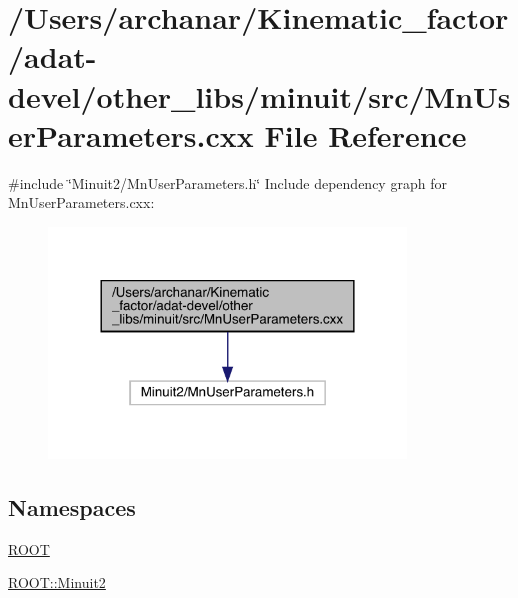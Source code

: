 \hypertarget{adat-devel_2other__libs_2minuit_2src_2MnUserParameters_8cxx}{}\section{/\+Users/archanar/\+Kinematic\+\_\+factor/adat-\/devel/other\+\_\+libs/minuit/src/\+Mn\+User\+Parameters.cxx File Reference}
\label{adat-devel_2other__libs_2minuit_2src_2MnUserParameters_8cxx}
{\ttfamily \#include \char`\"{}Minuit2/\+Mn\+User\+Parameters.\+h\char`\"{}}\newline
Include dependency graph for Mn\+User\+Parameters.\+cxx\+:
\nopagebreak
\begin{figure}[H]
\begin{center}
\leavevmode
\includegraphics[width=269pt]{df/dbf/adat-devel_2other__libs_2minuit_2src_2MnUserParameters_8cxx__incl}
\end{center}
\end{figure}
\subsection*{Namespaces}
\begin{DoxyCompactItemize}
\item 
 \mbox{\hyperlink{namespaceROOT}{R\+O\+OT}}
\item 
 \mbox{\hyperlink{namespaceROOT_1_1Minuit2}{R\+O\+O\+T\+::\+Minuit2}}
\end{DoxyCompactItemize}

